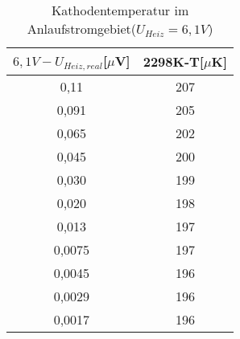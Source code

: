 \begin{table}[h]
	\begin{center}
		\begin{tabular}{cc}
			$6{,}1V-U_{Heiz,real}$[$\mu$V]&2298K-T[$\mu$K] \\ \hline
			0,11&207 \\
			0,091&205\\
			0,065&202\\
			0,045&200\\
			0,030&199\\
			0,020&198\\
			0,013&197\\
			0,0075&197\\
			0,0045&196\\
			0,0029&196\\
			0,0017&196
		\end{tabular}
		\caption{Kathodentemperatur im Anlaufstromgebiet($U_{Heiz}=6,1V$)}
		\label{tabanlauft}
	\end{center}
\end{table}